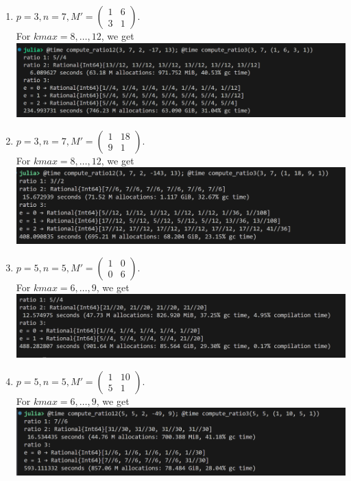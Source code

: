 \documentclass[letterpaper,12pt]{article}
\begin{document}
\begin{enumerate}
\item $p=3, n=7, M' = \begin{pmatrix}
1 & 6 \\ 3 & 1
\end{pmatrix}.$ \\
For $kmax = 8, \dots, 12$, we get \\
\includegraphics[scale=0.4]{ex13.png} \\

\item $p=3, n=7, M' = \begin{pmatrix}
1 & 18 \\ 9 & 1
\end{pmatrix}.$ \\
For $kmax = 8, \dots, 12$, we get \\
\includegraphics[scale=0.4]{ex14.png} \\

\item $p=5, n=5, M' = \begin{pmatrix}
1 & 0 \\ 0 & 6
\end{pmatrix}.$ \\
For $kmax = 6, \dots, 9$, we get \\
\includegraphics[scale=0.4]{ex15.png} \\

\item $p=5, n=5, M' = \begin{pmatrix}
1 & 10 \\ 5 & 1
\end{pmatrix}.$ \\
For $kmax = 6, \dots, 9$, we get \\
\includegraphics[scale=0.4]{ex16.png} \\

\end{enumerate}

\end{document}
